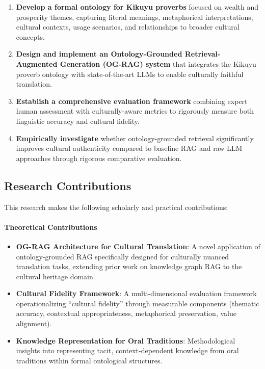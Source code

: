 \begin{enumerate}
    \item \textbf{Develop a formal ontology for Kikuyu proverbs} focused on wealth and prosperity themes, capturing literal meanings, metaphorical interpretations, cultural contexts, usage scenarios, and relationships to broader cultural concepts.
    
    \item \textbf{Design and implement an Ontology-Grounded Retrieval-Augmented Generation (OG-RAG) system} that integrates the Kikuyu proverb ontology with state-of-the-art LLMs to enable culturally faithful translation.
    
    \item \textbf{Establish a comprehensive evaluation framework} combining expert human assessment with culturally-aware metrics to rigorously measure both linguistic accuracy and cultural fidelity.
    
    \item \textbf{Empirically investigate} whether ontology-grounded retrieval significantly improves cultural authenticity compared to baseline RAG and raw LLM approaches through rigorous comparative evaluation.
\end{enumerate}

\subsection{Research Contributions}
\label{subsec:contributions}

This research makes the following scholarly and practical contributions:

\paragraph{Theoretical Contributions}

\begin{itemize}
    \item \textbf{OG-RAG Architecture for Cultural Translation}: A novel application of ontology-grounded RAG specifically designed for culturally nuanced translation tasks, extending prior work on knowledge graph RAG \cite{edge2024local} to the cultural heritage domain.
    
    \item \textbf{Cultural Fidelity Framework}: A multi-dimensional evaluation framework operationalizing ``cultural fidelity'' through measurable components (thematic accuracy, contextual appropriateness, metaphorical preservation, value alignment).
    
    \item \textbf{Knowledge Representation for Oral Traditions}: Methodological insights into representing tacit, context-dependent knowledge from oral traditions within formal ontological structures.
\end{itemize}

